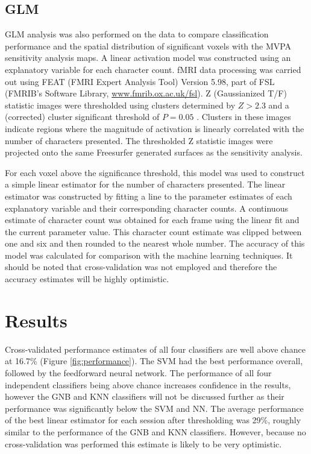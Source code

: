 \documentclass[5p,authoryear]{elsarticle}
\begin{document}
\subsection{GLM}
GLM analysis was also performed on the data to compare classification performance and the spatial distribution of significant voxels with the MVPA sensitivity analysis maps. 
A linear activation model was constructed using an explanatory variable for each character count.
fMRI data processing was carried out using FEAT (FMRI Expert Analysis Tool) Version 5.98, part of FSL (FMRIB's Software Library, \url{www.fmrib.ox.ac.uk/fsl}). 
Z (Gaussianized T/F) statistic images were thresholded using clusters determined by $Z > 2.3$ and a (corrected) cluster significant threshold of $P = 0.05$ \citep{Worsley2001}.
Clusters in these images indicate regions where the magnitude of activation is linearly correlated with the number of characters presented.
The thresholded Z statistic images were projected onto the same Freesurfer generated surfaces as the sensitivity analysis.

For each voxel above the significance threshold, this model was used to construct a simple linear estimator for the number of characters presented.
The linear estimator was constructed by fitting a line to the parameter estimates of each explanatory variable and their corresponding character counts.
A continuous estimate of character count was obtained for each frame using the linear fit and the current parameter value.
This character count estimate was clipped between one and six and then rounded to the nearest whole number.
The accuracy of this model was calculated for comparison with the machine learning techniques.
It should be noted that cross-validation was not employed and therefore the accuracy estimates will be highly optimistic.

\section{Results}
Cross-validated performance estimates of all four classifiers are well above chance at 16.7\% (Figure \ref{fig:performance}).
The SVM had the best performance overall, followed by the feedforward neural network.
The performance of all four independent classifiers being above chance increases confidence in the results, however the GNB and KNN classifiers will not be discussed further as their performance was significantly below the SVM and NN.
The average performance of the best linear estimator for each session after thresholding was 29\%, roughly similar to the performance of the GNB and KNN classifiers.
However, because no cross-validation was performed this estimate is likely to be very optimistic.
\end{document}
